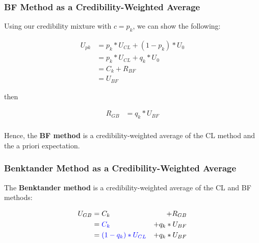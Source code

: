 \documentclass{article}
\begin{document}
\subsubsection{BF Method as a Credibility-Weighted Average}
    
Using our credibility mixture with $c = p_k$, we can show the following:

\begin{equation}
    \begin{aligned}
    U_{pk} &= p_k * U_{CL} + (1 - p_k) * U_0 \\
    &= p_k * U_{CL} + q_k * U_0 \\
    &= C_k + R_{BF} \\
    &= U_{BF}
    \end{aligned}
\end{equation}

then 

\begin{equation}
    \begin{aligned}
    R_{GB} &= q_k * U_{BF} \\
    \end{aligned}
\end{equation}

Hence, the \textbf{BF method} is a credibility-weighted average of the CL method
and the a priori expectation.

\subsubsection{Benktander Method as a Credibility-Weighted Average}

The \textbf{Benktander method} is a credibility-weighted average of the CL and
BF methods:

\begin{equation}
    \begin{aligned}
    U_{GB} &= C_k & + R_{GB} \\
    &= \color{blue}{C_k} & + q_k * U_{BF} \\
    &= \color{blue}{(1-q_k) * U_{CL}} & + q_k * U_{BF} \\
    \end{aligned}
\end{equation}
\end{document}
